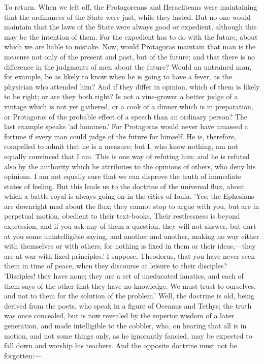 \documentclass[11pt,letter]{article}
\begin{document}
\par  To return. When we left off, the Protagoreans and Heracliteans were maintaining that the ordinances of the State were just, while they lasted. But no one would maintain that the laws of the State were always good or expedient, although this may be the intention of them. For the expedient has to do with the future, about which we are liable to mistake. Now, would Protagoras maintain that man is the measure not only of the present and past, but of the future; and that there is no difference in the judgments of men about the future? Would an untrained man, for example, be as likely to know when he is going to have a fever, as the physician who attended him? And if they differ in opinion, which of them is likely to be right; or are they both right? Is not a vine-grower a better judge of a vintage which is not yet gathered, or a cook of a dinner which is in preparation, or Protagoras of the probable effect of a speech than an ordinary person? The last example speaks 'ad hominen.' For Protagoras would never have amassed a fortune if every man could judge of the future for himself. He is, therefore, compelled to admit that he is a measure; but I, who know nothing, am not equally convinced that I am. This is one way of refuting him; and he is refuted also by the authority which he attributes to the opinions of others, who deny his opinions. I am not equally sure that we can disprove the truth of immediate states of feeling. But this leads us to the doctrine of the universal flux, about which a battle-royal is always going on in the cities of Ionia. 'Yes; the Ephesians are downright mad about the flux; they cannot stop to argue with you, but are in perpetual motion, obedient to their text-books. Their restlessness is beyond expression, and if you ask any of them a question, they will not answer, but dart at you some unintelligible saying, and another and another, making no way either with themselves or with others; for nothing is fixed in them or their ideas,—they are at war with fixed principles.' I suppose, Theodorus, that you have never seen them in time of peace, when they discourse at leisure to their disciples? 'Disciples! they have none; they are a set of uneducated fanatics, and each of them says of the other that they have no knowledge. We must trust to ourselves, and not to them for the solution of the problem.' Well, the doctrine is old, being derived from the poets, who speak in a figure of Oceanus and Tethys; the truth was once concealed, but is now revealed by the superior wisdom of a later generation, and made intelligible to the cobbler, who, on hearing that all is in motion, and not some things only, as he ignorantly fancied, may be expected to fall down and worship his teachers. And the opposite doctrine must not be forgotten:—
 
\end{document}
